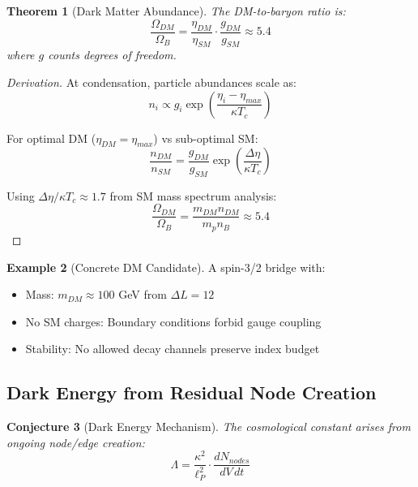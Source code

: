 \documentclass[11pt]{article}
\theoremstyle{plain}
\newtheorem{theorem}{Theorem}[section]
\newtheorem{conjecture}[theorem]{Conjecture}
\theoremstyle{definition}
\newtheorem{example}[theorem]{Example}
\begin{document}
\begin{theorem}[Dark Matter Abundance]
  The DM-to-baryon ratio is:
  \begin{equation}
    \frac{\Omega_{DM}}{\Omega_B} = \frac{\eta_{DM}}{\eta_{SM}} \cdot \frac{g_{DM}}{g_{SM}} \approx 5.4
  \end{equation}
  where $g$ counts degrees of freedom.
\end{theorem}

\begin{proof}[Derivation]
  At condensation, particle abundances scale as:
  \begin{equation}
    n_i \propto g_i \exp\left(\frac{\eta_i - \eta_{max}}{\kappa T_c}\right)
  \end{equation}

  For optimal DM ($\eta_{DM} = \eta_{max}$) vs sub-optimal SM:
  \begin{equation}
    \frac{n_{DM}}{n_{SM}} = \frac{g_{DM}}{g_{SM}} \exp\left(\frac{\Delta\eta}{\kappa T_c}\right)
  \end{equation}

  Using $\Delta\eta/\kappa T_c \approx 1.7$ from SM mass spectrum analysis:
  \begin{equation}
    \frac{\Omega_{DM}}{\Omega_B} = \frac{m_{DM} n_{DM}}{m_p n_B} \approx 5.4
  \end{equation}
\end{proof}

\begin{example}[Concrete DM Candidate]
  A spin-3/2 bridge with:
  \begin{itemize}
    \item Mass: $m_{DM} \approx 100$ GeV from $\Delta L = 12$
    \item No SM charges: Boundary conditions forbid gauge coupling
    \item Stability: No allowed decay channels preserve index budget
  \end{itemize}
\end{example}

\subsection{Dark Energy from Residual Node Creation}

\begin{conjecture}[Dark Energy Mechanism]
  The cosmological constant arises from ongoing node/edge creation:
  \begin{equation}
    \Lambda = \frac{\kappa^2}{\ell_P^2} \cdot \frac{dN_{nodes}}{dV \, dt}
  \end{equation}
\end{conjecture}
\end{document}
